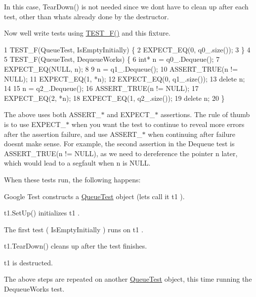 In this case, {\ttfamily Tear\+Down()} is not needed since we don\textquotesingle{}t have to clean up after each test, other than what\textquotesingle{}s already done by the destructor.

Now we\textquotesingle{}ll write tests using {\ttfamily \hyperlink{gtest_8h_a0ee66d464d1a06c20c1929cae09d8758}{T\+E\+S\+T\+\_\+\+F()}} and this fixture. 
\begin{DoxyCode}
1 TEST\_F(QueueTest, IsEmptyInitially) \{
2   EXPECT\_EQ(0, q0\_.size());
3 \}
4 
5 TEST\_F(QueueTest, DequeueWorks) \{
6   int* n = q0\_.Dequeue();
7   EXPECT\_EQ(NULL, n);
8 
9   n = q1\_.Dequeue();
10   ASSERT\_TRUE(n != NULL);
11   EXPECT\_EQ(1, *n);
12   EXPECT\_EQ(0, q1\_.size());
13   delete n;
14 
15   n = q2\_.Dequeue();
16   ASSERT\_TRUE(n != NULL);
17   EXPECT\_EQ(2, *n);
18   EXPECT\_EQ(1, q2\_.size());
19   delete n;
20 \}
\end{DoxyCode}


The above uses both {\ttfamily A\+S\+S\+E\+R\+T\+\_\+$\ast$} and {\ttfamily E\+X\+P\+E\+C\+T\+\_\+$\ast$} assertions. The rule of thumb is to use {\ttfamily E\+X\+P\+E\+C\+T\+\_\+$\ast$} when you want the test to continue to reveal more errors after the assertion failure, and use {\ttfamily A\+S\+S\+E\+R\+T\+\_\+$\ast$} when continuing after failure doesn\textquotesingle{}t make sense. For example, the second assertion in the {\ttfamily Dequeue} test is {\ttfamily A\+S\+S\+E\+R\+T\+\_\+\+T\+R\+UE(n != N\+U\+LL)}, as we need to dereference the pointer {\ttfamily n} later, which would lead to a segfault when {\ttfamily n} is {\ttfamily N\+U\+LL}.

When these tests run, the following happens\+:
\begin{DoxyEnumerate}
\item Google Test constructs a {\ttfamily \hyperlink{classQueueTest}{Queue\+Test}} object (let\textquotesingle{}s call it {\ttfamily t1} ).
\end{DoxyEnumerate}
\begin{DoxyEnumerate}
\item {\ttfamily t1.\+Set\+Up()} initializes {\ttfamily t1} .
\end{DoxyEnumerate}
\begin{DoxyEnumerate}
\item The first test ( {\ttfamily Is\+Empty\+Initially} ) runs on {\ttfamily t1} .
\end{DoxyEnumerate}
\begin{DoxyEnumerate}
\item {\ttfamily t1.\+Tear\+Down()} cleans up after the test finishes.
\end{DoxyEnumerate}
\begin{DoxyEnumerate}
\item {\ttfamily t1} is destructed.
\end{DoxyEnumerate}
\begin{DoxyEnumerate}
\item The above steps are repeated on another {\ttfamily \hyperlink{classQueueTest}{Queue\+Test}} object, this time running the {\ttfamily Dequeue\+Works} test.
\end{DoxyEnumerate}


